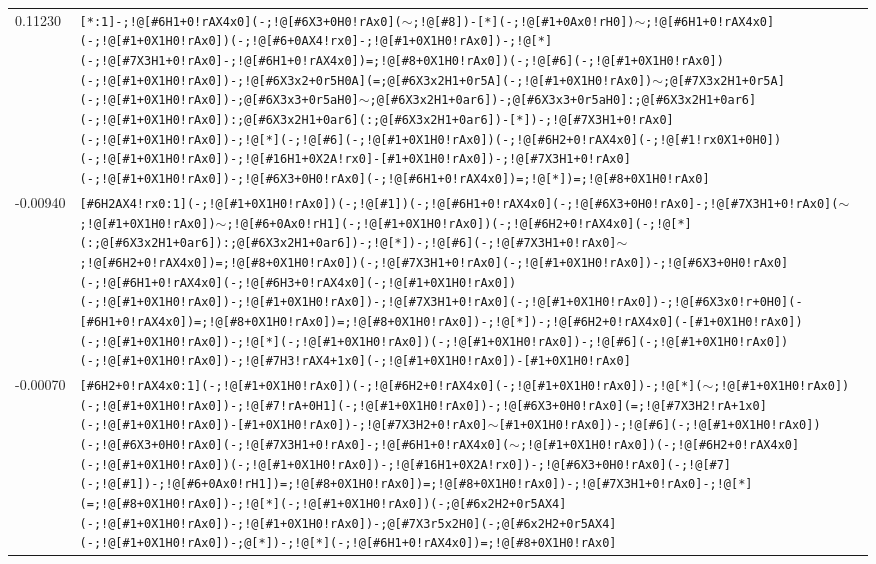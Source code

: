 \begin{longtable}{>{\baselineskip=10pt}p{} >{\baselineskip=10pt}p{}}
0.11230 & \texttt{[*:1]-;!@[\#6H1+0!rAX4x0](-;!@[\#6X3+0H0!rAx0]($\sim$;!@[\#8])-[*](-;!@[\#1+0Ax0!rH0])$\sim$;!@[\#6H1+0!rAX4x0](-;!@[\#1+0X1H0!rAx0])(-;!@[\#6+0AX4!rx0]-;!@[\#1+0X1H0!rAx0])-;!@[*](-;!@[\#7X3H1+0!rAx0]-;!@[\#6H1+0!rAX4x0])=;!@[\#8+0X1H0!rAx0])(-;!@[\#6](-;!@[\#1+0X1H0!rAx0])(-;!@[\#1+0X1H0!rAx0])-;!@[\#6X3x2+0r5H0A](=;@[\#6X3x2H1+0r5A](-;!@[\#1+0X1H0!rAx0])$\sim$;@[\#7X3x2H1+0r5A](-;!@[\#1+0X1H0!rAx0])-;@[\#6X3x3+0r5aH0]$\sim$;@[\#6X3x2H1+0ar6])-;@[\#6X3x3+0r5aH0]:;@[\#6X3x2H1+0ar6](-;!@[\#1+0X1H0!rAx0]):;@[\#6X3x2H1+0ar6](:;@[\#6X3x2H1+0ar6])-[*])-;!@[\#7X3H1+0!rAx0](-;!@[\#1+0X1H0!rAx0])-;!@[*](-;!@[\#6](-;!@[\#1+0X1H0!rAx0])(-;!@[\#6H2+0!rAX4x0](-;!@[\#1!rx0X1+0H0])(-;!@[\#1+0X1H0!rAx0])-;!@[\#16H1+0X2A!rx0]-[\#1+0X1H0!rAx0])-;!@[\#7X3H1+0!rAx0](-;!@[\#1+0X1H0!rAx0])-;!@[\#6X3+0H0!rAx0](-;!@[\#6H1+0!rAX4x0])=;!@[*])=;!@[\#8+0X1H0!rAx0]} \\ 
-0.00940 & \texttt{[\#6H2AX4!rx0:1](-;!@[\#1+0X1H0!rAx0])(-;!@[\#1])(-;!@[\#6H1+0!rAX4x0](-;!@[\#6X3+0H0!rAx0]-;!@[\#7X3H1+0!rAx0]($\sim$;!@[\#1+0X1H0!rAx0])$\sim$;!@[\#6+0Ax0!rH1](-;!@[\#1+0X1H0!rAx0])(-;!@[\#6H2+0!rAX4x0](-;!@[*](:;@[\#6X3x2H1+0ar6]):;@[\#6X3x2H1+0ar6])-;!@[*])-;!@[\#6](-;!@[\#7X3H1+0!rAx0]$\sim$;!@[\#6H2+0!rAX4x0])=;!@[\#8+0X1H0!rAx0])(-;!@[\#7X3H1+0!rAx0](-;!@[\#1+0X1H0!rAx0])-;!@[\#6X3+0H0!rAx0](-;!@[\#6H1+0!rAX4x0](-;!@[\#6H3+0!rAX4x0](-;!@[\#1+0X1H0!rAx0])(-;!@[\#1+0X1H0!rAx0])-;!@[\#1+0X1H0!rAx0])-;!@[\#7X3H1+0!rAx0](-;!@[\#1+0X1H0!rAx0])-;!@[\#6X3x0!r+0H0](-[\#6H1+0!rAX4x0])=;!@[\#8+0X1H0!rAx0])=;!@[\#8+0X1H0!rAx0])-;!@[*])-;!@[\#6H2+0!rAX4x0](-[\#1+0X1H0!rAx0])(-;!@[\#1+0X1H0!rAx0])-;!@[*](-;!@[\#1+0X1H0!rAx0])(-;!@[\#1+0X1H0!rAx0])-;!@[\#6](-;!@[\#1+0X1H0!rAx0])(-;!@[\#1+0X1H0!rAx0])-;!@[\#7H3!rAX4+1x0](-;!@[\#1+0X1H0!rAx0])-[\#1+0X1H0!rAx0]} \\ 
-0.00070 & \texttt{[\#6H2+0!rAX4x0:1](-;!@[\#1+0X1H0!rAx0])(-;!@[\#6H2+0!rAX4x0](-;!@[\#1+0X1H0!rAx0])-;!@[*]($\sim$;!@[\#1+0X1H0!rAx0])(-;!@[\#1+0X1H0!rAx0])-;!@[\#7!rA+0H1](-;!@[\#1+0X1H0!rAx0])-;!@[\#6X3+0H0!rAx0](=;!@[\#7X3H2!rA+1x0](-;!@[\#1+0X1H0!rAx0])-[\#1+0X1H0!rAx0])-;!@[\#7X3H2+0!rAx0]$\sim$[\#1+0X1H0!rAx0])-;!@[\#6](-;!@[\#1+0X1H0!rAx0])(-;!@[\#6X3+0H0!rAx0](-;!@[\#7X3H1+0!rAx0]-;!@[\#6H1+0!rAX4x0]($\sim$;!@[\#1+0X1H0!rAx0])(-;!@[\#6H2+0!rAX4x0](-;!@[\#1+0X1H0!rAx0])(-;!@[\#1+0X1H0!rAx0])-;!@[\#16H1+0X2A!rx0])-;!@[\#6X3+0H0!rAx0](-;!@[\#7](-;!@[\#1])-;!@[\#6+0Ax0!rH1])=;!@[\#8+0X1H0!rAx0])=;!@[\#8+0X1H0!rAx0])-;!@[\#7X3H1+0!rAx0]-;!@[*](=;!@[\#8+0X1H0!rAx0])-;!@[*](-;!@[\#1+0X1H0!rAx0])(-;@[\#6x2H2+0r5AX4](-;!@[\#1+0X1H0!rAx0])-;!@[\#1+0X1H0!rAx0])-;@[\#7X3r5x2H0](-;@[\#6x2H2+0r5AX4](-;!@[\#1+0X1H0!rAx0])-;@[*])-;!@[*](-;!@[\#6H1+0!rAX4x0])=;!@[\#8+0X1H0!rAx0]} \\ 

\end{longtable}
